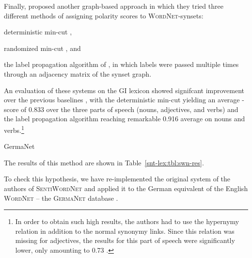 Finally, \citet{Rao:09} proposed another graph-based approach in which
they tried three different methods of assigning polarity scores to
\textsc{WordNet}-synsets:
\begin{inparaenum}
  \item deterministic min-cut \cite{Blum:01},
  \item randomized min-cut \cite{Blum:04}, and
  \item the label propagation algorithm of \citet{Zhu:02}, in which
    labels were passed multiple times through an adjacency matrix of
    the synset graph.
\end{inparaenum}
An evaluation of these systems on the GI lexicon \cite{Stone:66}
showed signifcant improvement over the previous baselines
\cite{Kamps:04,Kim:06}, with the deterministic min-cut yielding an
average \F{}-score of 0.833 over the three parts of speech (nouns,
adjectives, and verbs) and the label propagation algorithm reaching
remarkable 0.916 average \F{} on nouns and verbs.\footnote{In order to
  obtain such high results, the authors had to use the hypernymy
  relation in addition to the normal synonymy links.  Since this
  relation was missing for adjectives, the results for this part of
  speech were significantly lower, only amounting to 0.73 \F{}.}

\cite{Mohammad:09}


\cite{Hassan:10}

\cite{Dragut:10}

GermaNet \cite{Hamp:97}



The results of this method are shown in Table~\ref{snt-lex:tbl:swn-res}.

To check this hypothesis, we have re-implemented the original system
of the authors of \textsc{SentiWordNet} and applied it to the German
equivalent of the English \textsc{WordNet} \cite{Miller:95} -- the
\textsc{GermaNet} database \cite{Hamp:97}.


